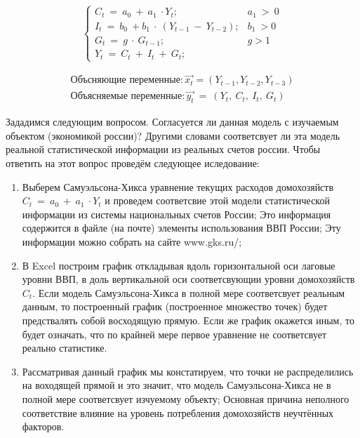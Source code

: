 \documentclass[12pt,a4paper]{article}
\begin{document}
\begin{equation*}
\begin{cases}
C_{t} \ =\ a_{0} \ +\ a_{1} \ \cdot Y_{t} ; & a_{1} \  >\ 0\\
I_{t} \ =\ b_{0} \ +b_{1} \ \cdot \ ( Y_{t-1} \ -\ Y_{t-2}) ; & b_{1} \  >0\\
G_{t} \ =\ g\ \cdot \ G_{t-1} ; & g >1\\
Y_{t} \ =\ C_{t} \ +\ I_{t} \ +\ G_{t} ; & 
\end{cases}
\end{equation*}

\begin{gather*}
\text{Объсняющие\ переменные}:\overrightarrow{x_{t}} =( Y_{t-1} ,Y_{t-2} ,Y_{t-3})\\
\text{Объясняемые\ переменные}:\overrightarrow{y_t} \ =\ ( Y_{t} ,\ C_{t} ,\ I_{t} ,\ G_{t})
\end{gather*}

	Зададимся следующим вопросом. Согласуется ли данная модель с изучаемым объектом (экономикой россии)? Другими словами соответсвует ли эта модель реальной статистической информации из реальных счетов россии. Чтобы ответить на этот вопрос проведём следующее иследование:
\begin{enumerate}
\item Выберем Самуэльсона-Хикса уравнение текущих расходов домохозяйств $\displaystyle C_{t} \ =\ a_{0} \ +\ a_{1} \ \cdot Y_{t}$ и проведем соответсвие этой модели статистической информации из системы национальных счетов России; Это информация содержится в файле (на почте) элементы использования ВВП России; Эту информации можно собрать на сайте www.gks.ru/;
\item В Excel построим график откладывая вдоль горизонтальной оси лаговые уровни ВВП, в доль вертикальной оси соответсвующии уровни домохозяйств $\displaystyle C_{t}$. Если модель Самуэльсона-Хикса в полной мере соответсвует реальным данным, то построенный график (построенное множество точек) будет предствалять собой восходящую прямую. Если же график окажется иным, то будет означать, что по крайней мере первое уравнение не соответсвует реально статистике.
\item Рассматривая данный график мы констатируем, что точки не распределились на воходящей прямой и это значит, что модель Самуэльсона-Хикса не в полной мере соответсвует изчуемому объекту; Основная причина неполного соответствие влияние на уровень потребления домохозяйств неучтённых факторов.
\end{enumerate}
\end{document}
